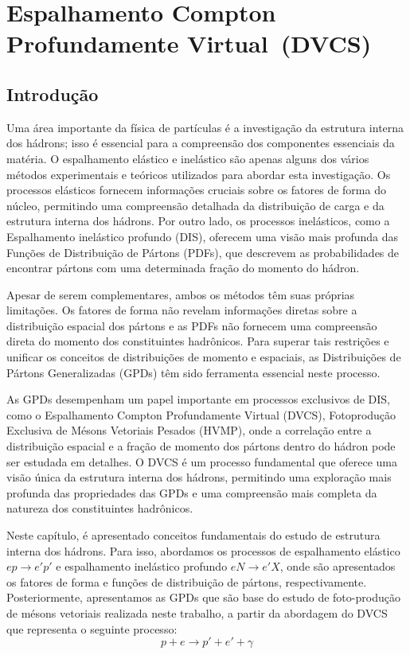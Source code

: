 \chapter{Espalhamento Compton Profundamente Virtual~(DVCS)}
\label{cap1}
\section{Introdução}
Uma área importante da física de partículas é a investigação da estrutura interna dos hádrons; isso é essencial para a compreensão dos componentes essenciais da matéria. O espalhamento elástico e inelástico são apenas alguns dos vários métodos experimentais e teóricos utilizados para abordar esta investigação.
Os processos elásticos fornecem informações cruciais sobre os fatores de forma do núcleo, permitindo uma compreensão detalhada da distribuição de carga e da estrutura interna dos hádrons. Por outro lado, os processos inelásticos, como a Espalhamento inelástico profundo (DIS), oferecem uma visão mais profunda das Funções de Distribuição de Pártons (PDFs), que descrevem as probabilidades de encontrar pártons com uma determinada fração do momento do hádron.

Apesar de serem complementares, ambos os métodos têm suas próprias limitações. Os fatores de forma não revelam informações diretas sobre a distribuição espacial dos pártons e as PDFs não fornecem uma compreensão direta do momento dos constituintes hadrônicos. Para superar tais restrições e unificar os conceitos de distribuições de momento e espaciais, as Distribuições de Pártons Generalizadas (GPDs) têm sido ferramenta essencial neste processo.

As GPDs  desempenham um papel importante em processos exclusivos de DIS, como o Espalhamento Compton Profundamente Virtual (DVCS),  Fotoprodução Exclusiva de Mésons Vetoriais Pesados (HVMP),  onde a correlação entre a distribuição espacial e a fração de momento dos pártons dentro do hádron pode ser estudada em detalhes. O DVCS é um processo fundamental que oferece uma visão única da estrutura interna dos hádrons, permitindo uma exploração mais profunda das propriedades das GPDs e uma compreensão mais completa da natureza dos constituintes hadrônicos.

Neste capítulo, é apresentado conceitos fundamentais do estudo de estrutura interna dos hádrons. Para isso, abordamos os processos de espalhamento elástico $ep \rightarrow e' p'$ e espalhamento  inelástico profundo $eN \rightarrow e' X$, onde são apresentados os fatores de forma e funções de distribuição de pártons, respectivamente.   Posteriormente, apresentamos as GPDs que são base do estudo  de foto-produção de mésons vetoriais realizada neste trabalho,  a partir da abordagem do DVCS que representa o seguinte processo:
\begin{equation}
p + e \rightarrow p' + e' + \gamma 
\end{equation}

